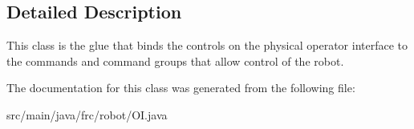 \subsection{Detailed Description}
This class is the glue that binds the controls on the physical operator interface to the commands and command groups that allow control of the robot. 

The documentation for this class was generated from the following file\+:\begin{DoxyCompactItemize}
\item 
src/main/java/frc/robot/O\+I.\+java\end{DoxyCompactItemize}
